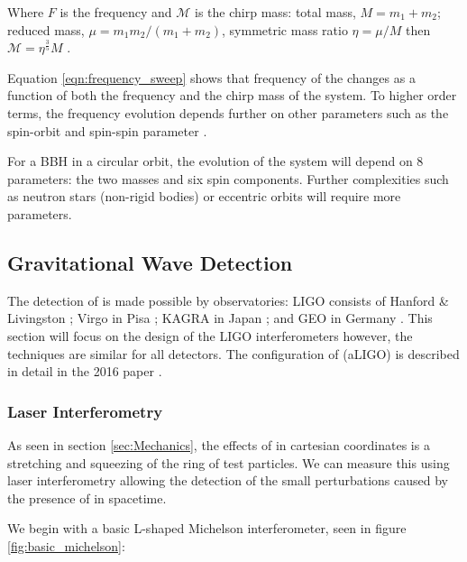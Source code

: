 Where $F$ is the \gw frequency and $\mathcal{M}$ is the chirp mass: total mass, $M = m_1 + m_2$; reduced mass, $\mu = m_1 m_2/(m_1+m_2)$, symmetric mass ratio $\eta = \mu/M$ then $\mathcal{M} = \eta^\frac{3}{5} M$ \cite{PoissonWill}.

Equation \ref{eqn:frequency_sweep} shows that frequency of the \gw changes as a function of both the frequency and the chirp mass of the system. To higher order terms, the frequency evolution depends further on other parameters such as the spin-orbit and spin-spin parameter \cite{Will1993}.

For a BBH in a circular orbit, the evolution of the system will depend on 8 parameters: the two masses and six spin components. Further complexities such as neutron stars (non-rigid bodies) or eccentric orbits will require more parameters.

\subsection{\label{sec:IFOs}Gravitational Wave Detection}

The detection of \gws is made possible by \gw observatories: LIGO consists of Hanford \& Livingston \cite{aligo}; Virgo in Pisa \cite{avirgo}; KAGRA in Japan \cite{kagra}; and GEO in Germany \cite{geo}. This section will focus on
the design of the LIGO interferometers however, the techniques are similar for all detectors. The configuration of \aligo (aLIGO) is described in detail in the 2016 paper \cite{aligo}.

\subsubsection{\label{sec:laser_interferometry}Laser Interferometry}

As seen in section \ref{sec:Mechanics}, the effects of \gws in cartesian coordinates is a stretching and squeezing of the ring of test particles. We can measure this using laser interferometry allowing the detection of the small
perturbations caused by the presence of \gws in spacetime.

We begin with a basic L-shaped Michelson interferometer, seen in figure \ref{fig:basic_michelson}:

